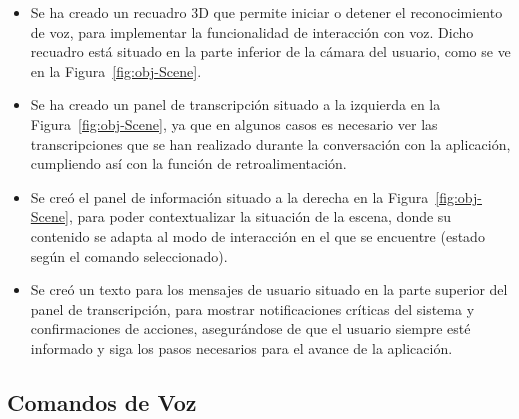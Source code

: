 \documentclass[a4paper, 12pt]{book}
\begin{document}
\begin{itemize}
  \setlength\itemsep{0.3em}
\setlength\parskip{0pt}  
  \item Se ha creado un recuadro 3D que permite iniciar o detener el reconocimiento de voz, para implementar la funcionalidad de interacción con voz. Dicho recuadro está situado en la parte inferior de la cámara del usuario, como se ve en la Figura~\ref{fig:obj-Scene}.
  \item Se ha creado un panel de transcripción situado a la izquierda en la Figura~\ref{fig:obj-Scene}, ya que en algunos casos es necesario ver las transcripciones que se han realizado durante la conversación con la aplicación, cumpliendo así con la función de retroalimentación.
  \item Se creó el panel de información situado a la derecha en la Figura~\ref{fig:obj-Scene}, para poder contextualizar la situación de la escena, donde su contenido se adapta al modo de interacción en el que se encuentre (estado según el comando seleccionado).
  \item Se creó un texto para los mensajes de usuario situado en la parte superior del panel de transcripción, para mostrar notificaciones críticas del sistema y confirmaciones de acciones, asegurándose de que el usuario siempre esté informado y siga los pasos necesarios para el avance de la aplicación.
\end{itemize}

\subsection{Comandos de Voz}
\end{document}
